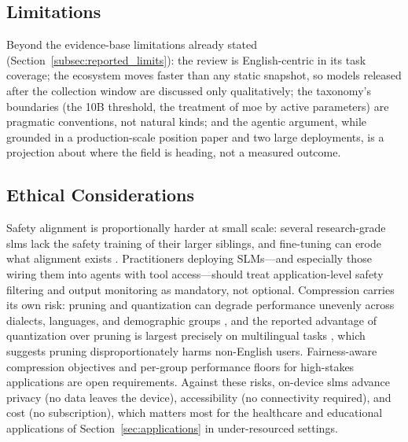 \subsection{Limitations}
\label{subsec:discussion_limitations}

Beyond the evidence-base limitations already stated
(Section~\ref{subsec:reported_limits}): the review is English-centric in its task
coverage; the ecosystem moves faster than any static snapshot, so models released
after the collection window are discussed only qualitatively; the taxonomy's
boundaries (the 10B threshold, the treatment of \gls{moe} by active parameters) are
pragmatic conventions, not natural kinds; and the agentic argument, while
grounded in a production-scale position paper \citep{belcak2025slm_agentic} and two
large deployments, is a projection about where the field is heading, not a
measured outcome.

\subsection{Ethical Considerations}
\label{subsec:discussion_ethics}

Safety alignment is proportionally harder at small scale: several research-grade
\glspl{slm} lack the safety training of their larger siblings, and fine-tuning can erode
what alignment exists \citep{qi2023finetuning}. Practitioners deploying SLMs---and
especially those wiring them into agents with tool access---should treat
application-level safety filtering and output monitoring as mandatory, not
optional. Compression carries its own risk: pruning and quantization can degrade
performance unevenly across dialects, languages, and demographic groups
\citep{blodgett2020language}, and the reported advantage of quantization over
pruning is largest precisely on multilingual tasks \citep{kurz2025pruning_vs_quant},
which suggests pruning disproportionately harms non-English users. Fairness-aware
compression objectives and per-group performance floors for high-stakes
applications are open requirements. Against these risks, on-device \glspl{slm} advance
privacy (no data leaves the device), accessibility (no connectivity required),
and cost (no subscription), which matters most for the healthcare and
educational applications of Section~\ref{sec:applications} in under-resourced
settings.
